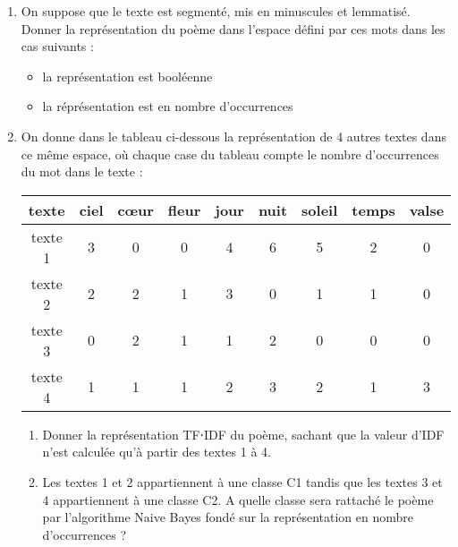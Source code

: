 \documentclass[a4paper, 11pt]{article}
\begin{document}
\begin{enumerate}
    \item On suppose que le texte est segmenté, mis en minuscules et lemmatisé. Donner la
        représentation du poème dans l'espace défini par ces mots dans les cas suivants :
        \begin{itemize}
            \item la représentation est booléenne
            \item la réprésentation est en nombre d'occurrences
        \end{itemize}
    \item On donne dans le tableau ci-dessous la représentation de 4 autres textes dans ce même
        espace, où chaque case du tableau compte le nombre d'occurrences du mot dans le texte :

        \begin{center}
        \begin{tabu}{|c|c|c|c|c|c|c|c|c|}
            \hline
            \textbf{texte} & ciel & cœur & fleur & jour & nuit & soleil & temps & valse\\
            \hline
            texte 1 & 3 & 0 & 0 & 4 & 6 & 5 & 2 & 0\\
            texte 2 & 2 & 2 & 1 & 3 & 0 & 1 & 1 & 0 \\
            texte 3 &  0 & 2 & 1 & 1 & 2 & 0 & 0 & 0\\
            texte 4 & 1 & 1 & 1 & 2 & 3 & 2 & 1 & 3 \\
            \hline
        \end{tabu}
        \end{center}

        \begin{enumerate}
            \item Donner la représentation TF⋅IDF du poème, sachant que la valeur d'IDF n'est calculée qu'à partir des textes 1 à 4.
            \item Les textes 1 et 2 appartiennent à une classe C1 tandis que les textes 3 et 4 appartiennent à une classe C2. A quelle classe sera rattaché le poème par l'algorithme Naive Bayes fondé sur la représentation en nombre d'occurrences ?
        \end{enumerate}
\end{enumerate}
\end{document}
